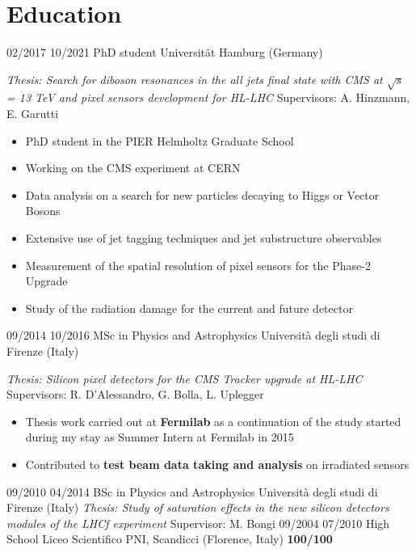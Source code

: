   \section{Education}
    \position
      {02/2017 \textemdash{} 10/2021}
      {PhD student}
      {Universit\"{a}t Hamburg (Germany)}
      {\textit{Thesis: Search for diboson resonances in the all jets final state with CMS at $\sqrt{s}$ = 13 TeV and pixel sensors development for HL-LHC} \newline  Supervisors: A. Hinzmann, E. Garutti  
      \begin{itemize}
\item PhD student in the PIER Helmholtz Graduate School
\item  Working on the CMS experiment at CERN
\item Data analysis on a search for new particles decaying to Higgs or Vector Bosons
\item Extensive use of jet tagging techniques and jet substructure observables
\item Measurement of the spatial resolution of pixel sensors for the Phase-2 Upgrade
\item Study of the radiation damage for the current and future detector
\end{itemize}}
  \position
      {09/2014 \textemdash{} 10/2016}
      {MSc in Physics and Astrophysics}
      {Universit\`a degli studi di Firenze (Italy)}
      {\textit{Thesis: Silicon pixel detectors for the CMS Tracker upgrade at HL-LHC} \newline Supervisors: R. D'Alessandro, G. Bolla, L. Uplegger  
      \begin{itemize}
\item Thesis work carried out at {\bf Fermilab} as a continuation of the study started during my stay as Summer Intern at Fermilab in 2015
\item Contributed to  {\bf test beam data taking and analysis} on irradiated sensors
\end{itemize}
 }
    \position
      {09/2010 \textemdash{} 04/2014}
      {BSc in Physics and Astrophysics}
      {Universit\`a degli studi di Firenze (Italy)}
      {\textit{Thesis:  Study of saturation effects in the new silicon detectors modules of the LHCf experiment}  \newline Supervisor: M. Bongi }
 \position
 {09/2004      \textemdash{} 07/2010}
 {High School}
 {Liceo Scientifico PNI, Scandicci (Florence, Italy)}
  {{\bf 100/100}}    
\fi
